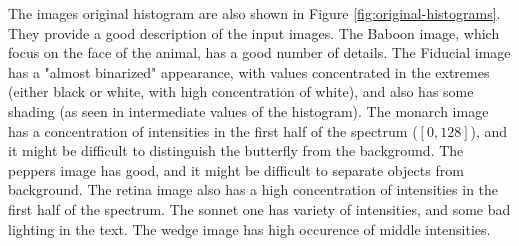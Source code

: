 \documentclass[]{IEEEtran}
\begin{document}
The images original histogram are also shown in Figure \ref{fig:original-histograms}. They provide a good description of the input images. The Baboon image, which focus on the face of the animal, has a good number of details. The Fiducial image has a "almost binarized" appearance, with values concentrated in the extremes (either black or white, with high concentration of white), and also has some shading (as seen in intermediate values of the histogram). The monarch image has a concentration of intensities in the first half of the spectrum ($[0, 128]$), and it might be difficult to distinguish the butterfly from the background. The peppers image has good, and it might be difficult to separate objects from background. The retina image also has a high concentration of intensities in the first half of the spectrum. The sonnet one has variety of intensities, and some bad lighting in the text. The wedge image has high occurence of middle intensities.
\end{document}
